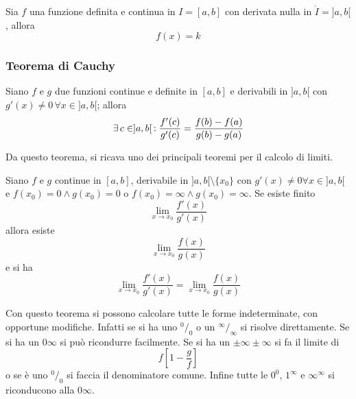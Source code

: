 \begin{lagrangeLemma2}\hypertarget{teor:lagrange:2}{}
  Sia $f$ una funzione definita e continua in $I=[a,b]$ con derivata nulla in $\dot{I}=]a,b[$, 
  allora
  \begin{equation*}
    f(x) = k
  \end{equation*}
\end{lagrangeLemma2}

\subsubsection{Teorema di Cauchy}
\begin{cauchy}
  Siano $f$ e $g$ due funzioni continue e definite in $[a,b]$ e derivabili in $]a,b[$ con
  $g'(x)\neq0\,\forall x\in]a,b[$; allora
  \begin{equation*}
    \exists\,c\in]a,b[\,: \frac{f'(c)}{g'(c)}=\frac{f(b)-f(a)}{g(b)-g(a)}
  \end{equation*}
\end{cauchy}
Da questo teorema, si ricava uno dei principali teoremi per il calcolo di limiti.
\begin{hopital}
  Siano $f$ e $g$ continue in $[a,b]$, derivabile in $]a,b[\setminus\{x_0\}$ con 
  $g'(x)\neq0\forall x\in]a,b[$ e $f(x_0)=0 \land g(x_0)=0$ o $f(x_0)=\infty\land g(x_0)=\infty$.
  Se esiste finito
  \begin{equation*}
    \lim\limits_{x\to x_0} \frac{f'(x)}{g'(x)}
  \end{equation*}
  allora esiste
  \begin{equation*}
    \lim\limits_{x\to x_0} \frac{f(x)}{g(x)}
  \end{equation*}
  e si ha
  \begin{equation*}
    \lim\limits_{x\to x_0} \frac{f'(x)}{g'(x)} = \lim\limits_{x\to x_0} \frac{f(x)}{g(x)}
  \end{equation*}
\end{hopital}
Con questo teorema si possono calcolare tutte le forme indeterminate, con opportune modifiche. 
Infatti se si ha uno $^0\!/_0$ o un $^\infty\!/_\infty$ si risolve direttamente. Se si ha un
$0\infty$ si può ricondurre facilmente. Se si ha un $\pm\infty\pm\infty$
si fa il limite di
\begin{equation*}
  f \left[ 1-\frac{g}{f} \right]
\end{equation*}
o se è uno $^0\!/_0$ si faccia il denominatore comune. Infine tutte le $0^0$, $1^\infty$ e
$\infty^\infty$ si riconducono alla $0\infty$.

